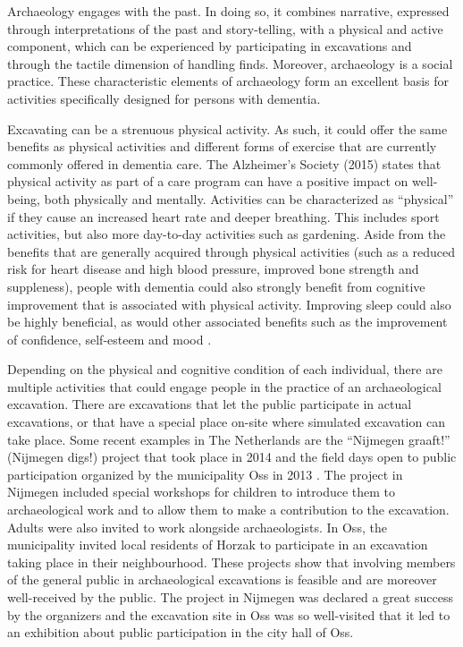 	
	Archaeology engages with the past. In doing so, it combines narrative, expressed through interpretations of the past and story-telling, with a physical and active component, which can be experienced by participating in excavations and through the tactile dimension of handling finds. Moreover, archaeology is a social practice. These characteristic elements of archaeology form an excellent basis for activities specifically designed for persons with dementia.	
		
	Excavating can be a strenuous physical activity. As such, it could offer the same benefits as physical activities and different forms of exercise that are currently commonly offered in dementia care. The Alzheimer’s Society (2015) states that physical activity as part of a care program can have a positive impact on well-being, both physically and mentally. Activities can be characterized as “physical” if they cause an increased heart rate and deeper breathing. This includes sport activities, but also more day-to-day activities such as gardening. Aside from the benefits that are generally acquired through physical activities (such as a reduced risk for heart disease and high blood pressure, improved bone strength and suppleness), people with dementia could also strongly benefit from cognitive improvement that is associated with physical activity. Improving sleep could also be highly beneficial, as would other associated benefits such as the improvement of confidence, self-esteem and mood \parencite{Association_2015}.
	
	Depending on the physical and cognitive condition of each individual, there are multiple activities that could engage people in the practice of an archaeological excavation.  There are excavations that let the public participate in actual excavations, or that have a special place on-site where simulated excavation can take place. Some recent examples in The Netherlands are the “Nijmegen graaft!” (Nijmegen digs!) project that took place in 2014 \parencite{Unknown_2014} and the field days open to public participation organized by the municipality Oss in 2013 \parencite{Unknown_2013}. The project in Nijmegen included special workshops for children to introduce them to archaeological work and to allow them to make a contribution to the excavation. Adults were also invited to work alongside archaeologists. In Oss, the municipality invited local residents of Horzak to participate in an excavation taking place in their neighbourhood. These projects show that involving members of the general public in archaeological excavations is feasible and are moreover well-received by the public. The project in Nijmegen was declared a great success by the organizers and the excavation site in Oss was so well-visited that it led to an exhibition about public participation in the city hall of Oss.
	
